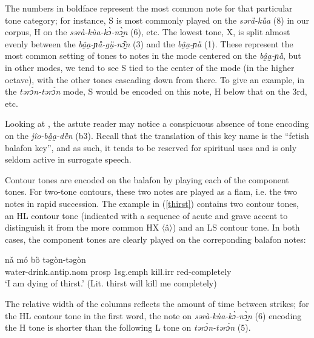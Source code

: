 \documentclass[output=paper]{langscibook}
\begin{document}
The numbers in boldface represent the most common note for that particular tone category; for instance, S is most commonly played on the \textit{sərȁ-kȕa} (8) in our corpus, H on the \textit{sərà-kùa-kɔ̀-nɔ̰̀n} (6), etc. The lowest tone, X, is split almost evenly between the \textit{bâ̰a̰-ɲȁ-gṵ̏-nɔ̰̏n} (3) and the \textit{bâ̰a̰-ɲȁ} (1). These represent the most common setting of tones to notes in the mode centered on the \textit{bâ̰a̰-ɲȁ}, but in other modes, we tend to see S tied to the center of the mode (in the higher octave), with the other tones cascading down from there. To give an example, in the \textit{tərɔ́n-tərɔ́n} mode, S would be encoded on this note, H below that on the 3rd, etc. 

Looking at , the astute reader may notice a conspicuous absence of tone encoding on the \textit{jîo-bȁ̰a̰-dȅn} (b3). Recall that the translation of this key name is the ``fetish balafon key'', and as such, it tends to be reserved for spiritual uses and is only seldom active in surrogate speech. 

Contour tones are encoded on the balafon by playing each of the component tones. For two-tone contours, these two notes are played as a flam, i.e. the two notes in rapid succession. The example in (\ref{thirst}) contains two contour tones, an HL contour tone (indicated with a sequence of acute and grave accent to distinguish it from the more common HX 〈â〉) and an LS contour tone. In both cases, the component tones are clearly played on the correponding balafon notes:

\ea\label{thirst} 
\ea
  nǎ mó bȍ təgòn-təgòn \\
water-drink.{\sc antip.nom} {\sc prosp} {\sc 1sg.emph} kill.{\sc irr} {\sc red-}completely \\
\glt `I am dying of thirst.' (Lit. thirst will kill me completely) \\
\ex {}
\z
\z

The relative width of the columns reflects the amount of time between strikes; for the HL contour tone in the first word, the note on \textit{sərà-kùa-kɔ̀-nɔ̰̀n} (6) encoding the H tone is shorter than the following L tone on \textit{tərɔ́n-tərɔ́n} (5). 
\end{document}
